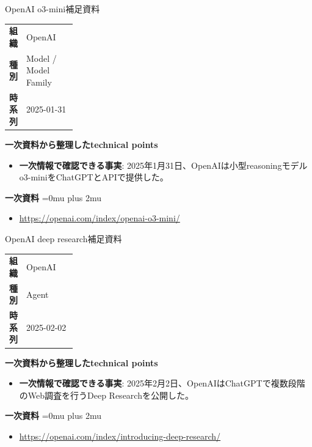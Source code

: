 \begin{technicalnote}{OpenAI o3-mini}{補足資料}
\begingroup
\begin{tabularx}{\linewidth}{@{}>{\bfseries}p{0.22\linewidth}X@{}}
組織 & OpenAI \\
種別 & Model / Model Family \\
時系列 & 2025-01-31 \\
\end{tabularx}
\smallskip
{\bfseries 一次資料から整理したtechnical points}
\begin{itemize}[leftmargin=1.5em,itemsep=0.35em]
\item \textbf{一次情報で確認できる事実}: 2025年1月31日、OpenAIは小型reasoningモデルo3-miniをChatGPTとAPIで提供した。
\end{itemize}
\begin{samepage}
{\bfseries 一次資料}
\begingroup\sloppy
\Urlmuskip=0mu plus 2mu\relax
\begin{itemize}[leftmargin=1.5em,itemsep=0.25em]
\item {\scriptsize\url{https://openai.com/index/openai-o3-mini/}}
\end{itemize}
\endgroup
\end{samepage}
\endgroup
\end{technicalnote}
\medskip

\begin{technicalnote}{OpenAI deep research}{補足資料}
\begingroup
\begin{tabularx}{\linewidth}{@{}>{\bfseries}p{0.22\linewidth}X@{}}
組織 & OpenAI \\
種別 & Agent \\
時系列 & 2025-02-02 \\
\end{tabularx}
\smallskip
{\bfseries 一次資料から整理したtechnical points}
\begin{itemize}[leftmargin=1.5em,itemsep=0.35em]
\item \textbf{一次情報で確認できる事実}: 2025年2月2日、OpenAIはChatGPTで複数段階のWeb調査を行うDeep Researchを公開した。
\end{itemize}
\begin{samepage}
{\bfseries 一次資料}
\begingroup\sloppy
\Urlmuskip=0mu plus 2mu\relax
\begin{itemize}[leftmargin=1.5em,itemsep=0.25em]
\item {\scriptsize\url{https://openai.com/index/introducing-deep-research/}}
\end{itemize}
\endgroup
\end{samepage}
\endgroup
\end{technicalnote}
\medskip

